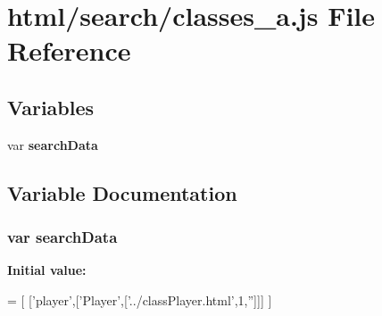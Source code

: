 \section{html/search/classes\-\_\-a.js File Reference}
\label{classes__a_8js}
\subsection*{Variables}
\begin{DoxyCompactItemize}
\item 
var {\bf search\-Data}
\end{DoxyCompactItemize}


\subsection{Variable Documentation}
\subsubsection[{search\-Data}]{\setlength{\rightskip}{0pt plus 5cm}var search\-Data}\label{classes__a_8js_ad01a7523f103d6242ef9b0451861231e}
{\bfseries Initial value\-:}
\begin{DoxyCode}
=
[
  [\textcolor{stringliteral}{'player'},[\textcolor{stringliteral}{'Player'},[\textcolor{stringliteral}{'../classPlayer.html'},1,\textcolor{stringliteral}{''}]]]
]
\end{DoxyCode}
